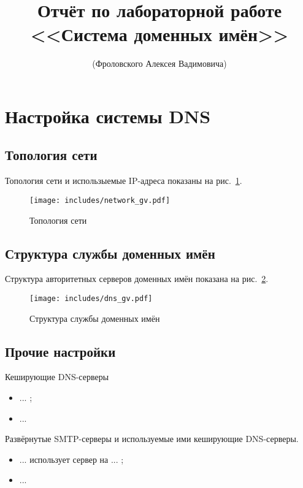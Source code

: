\documentclass[a4paper,12pt]{article}
\title{Отчёт по лабораторной работе \\ <<Система доменных имён>>}
\author{(Фроловского Алексея Вадимовича)}
\begin{document}
\maketitle

\tableofcontents

\section{Настройка системы DNS}

\subsection{Топология сети}

Топология сети и использыемые IP-адреса показаны на рис.~\ref{fig:network}.

\begin{figure}
\centering
\texttt{[image: includes/network\_gv.pdf]}
\caption{Топология сети}
\label{fig:network}
\end{figure}

\subsection{Структура службы доменных имён}

Структура авторитетных серверов доменных имён показана на рис.~\ref{fig:dns}.

\begin{figure}
\centering
\texttt{[image: includes/dns\_gv.pdf]}
\caption{Структура службы доменных имён}
\label{fig:dns}
\end{figure}

\subsection{Прочие настройки}

Кеширующие DNS-серверы
\begin{itemize}
\item ... ;
\item ...
\end{itemize}

Развёрнутые SMTP-серверы и используемые ими кеширующие DNS-серверы.
\begin{itemize}
\item ... использует сервер на ... ;
\item ...
\end{itemize}
\end{document}
